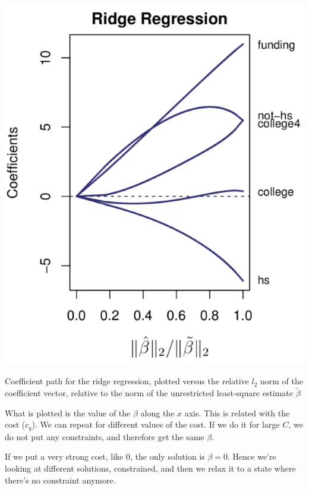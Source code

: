 \documentclass[a4paper]{tufte-book}
\begin{document}
\begin{marginfigure}
    \includegraphics{./Figures/ridgecrime.png}
    \caption{Coefficient path for the ridge regression, plotted versus the
        relative $l_2$ norm of the coefficient vector, relative to the norm of
        the unrestricted least-square estimate $\tilde \beta$
    }
    \label{ridgecrime}
\end{marginfigure}


What is plotted is the value of the $\beta$ along the $x$ axis. This is related
with the cost ($c_q$). 
We can repeat for different values of the cost.
If we do it for large $C$, we do not put any constraints, and therefore get the same $\beta$.

If we put a very strong cost, like $0$, the only solution is $\beta = 0$.
Hence we’re looking at different solutions, constrained, and then we relax it to
a state where there’s no constraint anymore.
\end{document}
